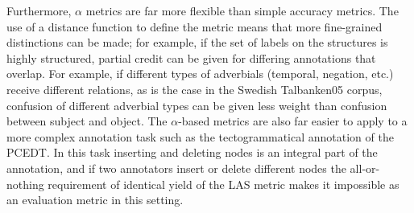 \documentclass[11pt]{article}
\makeatletter
\def\noparencite#1#2{{#1\if@tempswa , #2\fi}}
\newcommand\citeNP[1]{{\let\@cite=\noparencite\cite{#1}}}
\makeatother
\begin{document}

Furthermore, $\alpha$ metrics are far more flexible than simple accuracy
metrics. The use of a distance function to define the metric means that more
fine-grained distinctions can be made; for example, if the set of labels on
the structures is highly structured, partial credit can be given for differing
annotations that overlap. For example, if different types of adverbials
(temporal, negation, etc.) receive different relations, as is the case in the
Swedish Talbanken05 \cite{Niv:Nil:Hal06} corpus, confusion of different
adverbial types can be given less weight than confusion between subject and
object. The $\alpha$-based metrics are also far easier to apply to a more
complex annotation task such as the tectogrammatical annotation of the PCEDT.
In this task inserting and deleting nodes is an integral part of the
annotation, and if two annotators insert or delete different nodes the
all-or-nothing requirement of identical yield of the LAS metric makes it
impossible as an evaluation metric in this setting.
\end{document}
